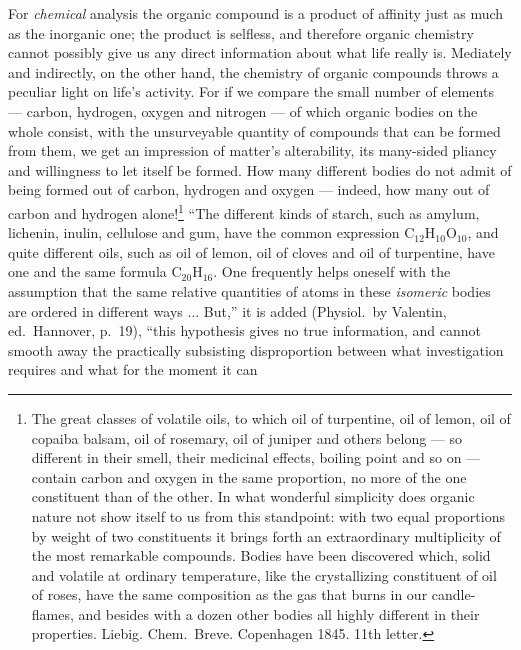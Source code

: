 \documentclass[12pt,a4paper]{book}
\begin{document}
For \emph{chemical} analysis the organic compound is a product of affinity just
as much as the inorganic one; the product is selfless, and therefore organic
chemistry cannot possibly give us any direct information about what life really
is. Mediately and indirectly, on the other hand, the chemistry of organic
compounds throws a peculiar light on life's activity. For if we compare the
small number of elements --- carbon, hydrogen, oxygen and nitrogen --- of which
organic bodies on the whole consist, with the unsurveyable quantity of
compounds that can be formed from them, we get an impression of matter's
alterability, its many-sided pliancy and willingness to let itself be formed.
How many different bodies do not
\setcounter{footnote}{0}
admit of being formed out of carbon, hydrogen and oxygen --- indeed, how many
out of carbon and hydrogen alone!\footnote{The great classes of volatile oils,
to which oil of turpentine, oil of lemon, oil of copaiba balsam, oil of
rosemary, oil of juniper and others belong --- so different in their smell,
their medicinal effects, boiling point and so on --- contain carbon and oxygen
in the same proportion, no more of the one constituent than of the other. In
what wonderful simplicity does organic nature not show itself to us from this
standpoint: with two equal proportions by weight of two constituents it brings
forth an extraordinary multiplicity of the most remarkable compounds. Bodies
have been discovered which, solid and volatile at ordinary temperature, like
the crystallizing constituent of oil of roses, have the same composition as the
gas that burns in our candle-flames, and besides with a dozen other bodies all
highly different in their properties. Liebig. Chem.\ Breve. Copenhagen 1845.
11th letter.}
``The different kinds of starch, such as amylum, lichenin, inulin, cellulose
and gum, have the common expression
$\mathrm{C}_{12}\mathrm{H}_{10}\mathrm{O}_{10}$, and quite different oils, such
as oil of lemon, oil of cloves and oil of turpentine, have one and the same
formula $\mathrm{C}_{20}\mathrm{H}_{16}$. One frequently helps oneself with the
assumption that the same relative quantities of atoms in these \emph{isomeric}
bodies are ordered in different ways ... But,'' it is added (Physiol.\ by
Valentin, ed.\ Hannover, p.~19), ``this hypothesis gives no true information,
and cannot smooth away the practically subsisting disproportion between what
investigation requires and what for the moment it can
\end{document}
